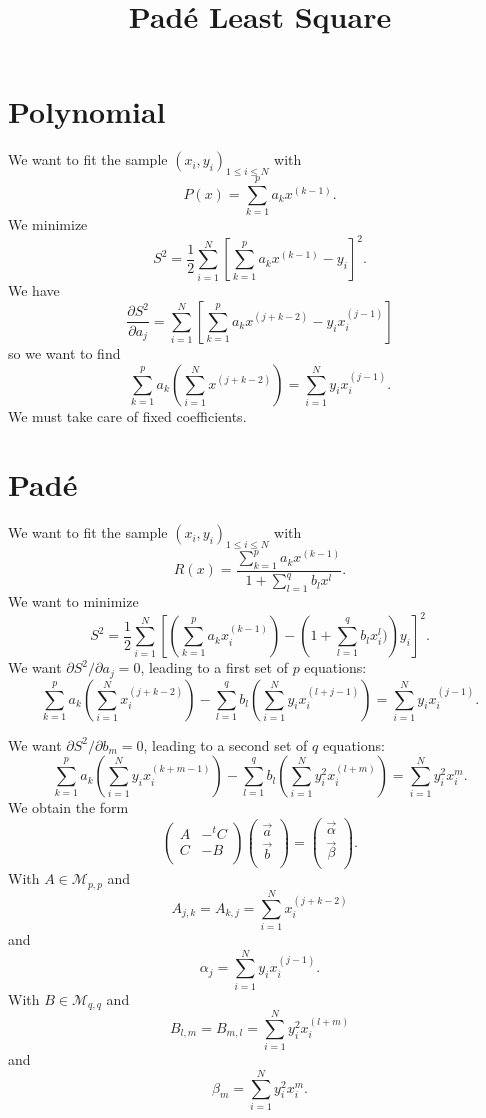 \documentclass[aps,twocolumn]{revtex4}
\begin{document}
\title{Padé Least Square}
\section{Polynomial}
We want to fit the sample $(x_i,y_i)_{1\leq i \leq N}$
with
$$
	P(x) = \sum_{k=1}^p a_k x^{(k-1)}.
$$
We minimize
$$
	S^2 = \dfrac{1}{2} \sum_{i=1}^N \left[  \sum_{k=1}^p a_k x^{(k-1)} - y_i \right]^2.
$$
We have
$$
	\dfrac{\partial S^2}{\partial a_j} = \sum_{i=1}^{N} \left[  \sum_{k=1}^p a_k x^{(j+k-2)} - y_ix_i^{(j-1)} \right] 
$$
so we want to find
$$
	\sum_{k=1}^p a_k \left( \sum_{i=1}^{N} x^{(j+k-2)}\right)  = \sum_{i=1}^{N} y_ix_i^{(j-1)}.
$$
We must take care of fixed coefficients.

\section{Pad\'e}
We want to fit the sample $(x_i,y_i)_{1\leq i \leq N}$
with
$$
	R(x) = \dfrac{\displaystyle\sum_{k=1}^p a_k x^{(k-1)}}{\displaystyle 1+\sum_{l=1}^q b_l x^{l}}.
$$
We want to minimize
$$
	S^2 = \dfrac{1}{2}\sum_{i=1}^N \left[ \left(\sum_{k=1}^p a_k x_i^{(k-1)}\right) - \left(1+\sum_{l=1}^{q} b_l x_i^l)\right)y_i  \right]^2.
$$
We want	$\partial S^2/\partial a_j=0$, leading to a first set of $p$ equations:
$$
	\sum_{k=1}^{p} a_k \left(\sum_{i=1}^{N}x_i^{(j+k-2)}\right) - 
	\sum_{l=1}^{q} b_l \left(\sum_{i=1}^N y_i x_i^{(l+j-1)} \right) = \sum_{i=1}^N y_i x_i^{(j-1)}.
$$

We want $\partial S^2/\partial b_m=0$, leading to a second set of $q$ equations:
$$
	\sum_{k=1}^p a_k \left(\sum_{i=1}^N y_ix_i^{(k+m-1)}\right) - 
	\sum_{l=1}^q b_l \left(\sum_{i=1}^N y_i^2 x_i^{(l+m)}\right) = \sum_{i=1}^N y_i^2 x_i^{m}.
$$
We obtain the form
$$
	\begin{pmatrix}
	A & -\!\!^tC\\
	 C & -B\\
	\end{pmatrix}
	\begin{pmatrix}
	\vec{a} \\
	\vec{b} \\
	\end{pmatrix}
	=
	\begin{pmatrix}
	\vec{\alpha}\\
	\vec{\beta} \\
	\end{pmatrix}.
$$
With $A\in\mathcal{M}_{p,p}$ and
$$
	A_{j,k} = A_{k,j} = \sum_{i=1}^N x_i^{(j+k-2)}
$$
and
$$
	\alpha_j = \sum_{i=1}^N y_ix_i^{(j-1)}.
$$
With $B\in\mathcal{M}_{q,q}$ and
$$
	B_{l,m} = B_{m,l} = \sum_{i=1}^N y_i^2x_i^{(l+m)}
$$
and
$$
	\beta_m = \sum_{i=1}^N y_i^2 x_i^{m}.
$$
\end{document}
